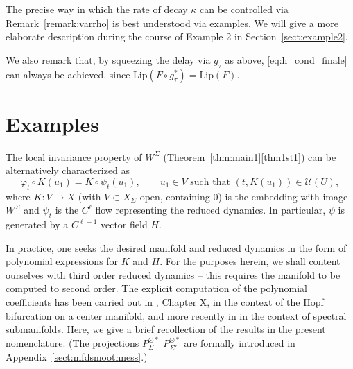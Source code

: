 \documentclass[a4paper, 12pt, oneside, reqno, notitlepage]{amsart}
\theoremstyle{plain}
\theoremstyle{definition}
\theoremstyle{remark}
\newcommand{\lip}{\mathrm{Lip}}
\begin{document}
The precise way in which the rate of decay $\kappa$ can be controlled via Remark~\ref{remark:varrho} is best understood via examples.
We will give a more elaborate description during the course of Example 2 in Section~\ref{sect:example2}. 

We also remark that, by squeezing the delay via $g_\tau$ as above, \eqref{eq:h_cond_finale} can always be achieved, since $\lip(F \circ g^*_\tau) = \lip(F)$.







\section{Examples}
\label{sect:examples}

The local invariance property of $W^\Sigma$ (Theorem~\ref{thm:main1}\ref{thm1st1}) can be alternatively characterized as 
\begin{equation}
    \varphi_t \circ K (u_1)= K \circ \psi_t (u_1), \qquad u_1 \in V \text{ such that } (t,K(u_1)) \in \mathcal{U}(U),
    \label{eq:invariance_examples}
\end{equation}
where $K : V \to X$ (with $V \subset X_\Sigma$ open, containing $0$) is the embedding with image $W^\Sigma$ and $\psi_t$ is the $C^\ell$ flow representing the reduced dynamics.
In particular, $\psi$ is generated by a $C^{\ell-1}$ vector field $H$.




In practice, one seeks the desired manifold and reduced dynamics in the form of polynomial expressions for $K$ and $H$.
For the purposes herein, we shall content ourselves with third order reduced dynamics -- this requires the manifold to be computed to second order.
The explicit computation of the polynomial coefficients
has been carried out in \cite{diekmann2012delay}, Chapter X, in the context of the Hopf bifurcation on a center manifold,
and more recently in \cite{szaksz2025spectral} in the context of spectral submanifolds.
Here, we give a brief recollection of the results in the present nomenclature.
(The projections $P_{\Sigma}^{\odot *}$ $P_{\Sigma'}^{\odot *}$ are formally introduced in Appendix~\ref{sect:mfdsmoothness}.)
\end{document}
